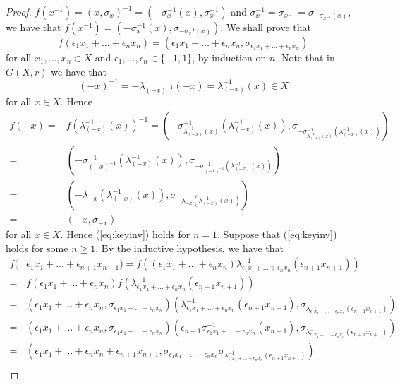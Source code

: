 \begin{proof}
 $f(x^{-1})=(x,\sigma_x)^{-1}=(-\sigma_x^{-1}(x),\sigma_x^{-1})$ and
 $\sigma_x^{-1}=\sigma_{x^{-1}}=\sigma_{-\sigma_{x^{-1}}(x)}$, we have that $f(x^{-1})=(-\sigma^{-1}_x(x),\sigma_{-\sigma^{-1}_x(x)})$. We shall prove that
 \begin{equation}\label{eq:keyinv}
     f(\epsilon_1x_1+\dots +\epsilon_nx_n)=(\epsilon_1x_1+\dots +\epsilon_nx_n,\sigma_{\epsilon_1x_1+\dots +\epsilon_nx_n})
 \end{equation}
for all $x_1,\dots ,x_n\in X$ and $\epsilon_1,\dots ,\epsilon_n\in\{ -1,1\}$, by induction on $n$. Note that in $G(X,r)$ we have that
\[ (-x)^{-1}=-\lambda_{(-x)^{-1}}(-x)=\lambda^{-1}_{(-x)}(x)\in X \]
for all $x\in X$.
Hence 
 \begin{align*}
 f(-x)=&f(\lambda^{-1}_{(-x)}(x))^{-1}=(-\sigma_{\lambda^{-1}_{(-x)}(x)}^{-1}(\lambda^{-1}_{(-x)}(x)),\sigma_{-\sigma_{\lambda^{-1}_{(-x)}(x)}^{-1}(\lambda^{-1}_{(-x)}(x))})\\
 =&(-\sigma_{(-x)^{-1}}^{-1}(\lambda^{-1}_{(-x)}(x)),\sigma_{-\sigma_{(-x)^{-1}}^{-1}(\lambda^{-1}_{(-x)}(x))})\\
 =&(-\lambda_{-x}(\lambda^{-1}_{(-x)}(x)),\sigma_{-\lambda_{-x}(\lambda^{-1}_{(-x)}(x))})\\
 =&(-x,\sigma_{-x})
\end{align*} 
for all $x\in X$. Hence (\ref{eq:keyinv}) holds for $n=1$. Suppose that (\ref{eq:keyinv}) holds for some $n\geq 1$. By the inductive hypothesis, we have that
\begin{align*}
    f(&\epsilon_1x_1+\dots +\epsilon_{n+1}x_{n+1})=f((\epsilon_1x_1+\dots +\epsilon_nx_n)\lambda^{-1}_{\epsilon_1x_1+\dots +\epsilon_nx_n}(\epsilon_{n+1}x_{n+1}))\\
    =&f(\epsilon_1x_1+\dots +\epsilon_nx_n)f(\lambda^{-1}_{\epsilon_1x_1+\dots +\epsilon_nx_n}(\epsilon_{n+1}x_{n+1}))\\
    =&(\epsilon_1x_1+\dots +\epsilon_nx_n,\sigma_{\epsilon_1x_1+\dots +\epsilon_nx_n})(\lambda^{-1}_{\epsilon_1x_1+\dots +\epsilon_nx_n}(\epsilon_{n+1}x_{n+1}),\sigma_{\lambda^{-1}_{\epsilon_1x_1+\dots +\epsilon_nx_n}(\epsilon_{n+1}x_{n+1})})\\
    =&(\epsilon_1x_1+\dots +\epsilon_nx_n,\sigma_{\epsilon_1x_1+\dots +\epsilon_nx_n})(\epsilon_{n+1}\sigma^{-1}_{\epsilon_1x_1+\dots +\epsilon_nx_n}(x_{n+1}),\sigma_{\lambda^{-1}_{\epsilon_1x_1+\dots +\epsilon_nx_n}(\epsilon_{n+1}x_{n+1})})\\
    =&(\epsilon_1x_1+\dots +\epsilon_nx_n+\epsilon_{n+1}x_{n+1},\sigma_{\epsilon_1x_1+\dots +\epsilon_nx_n}\sigma_{\lambda^{-1}_{\epsilon_1x_1+\dots +\epsilon_nx_n}(\epsilon_{n+1}x_{n+1})})\\

\end{align*}
\end{proof}
